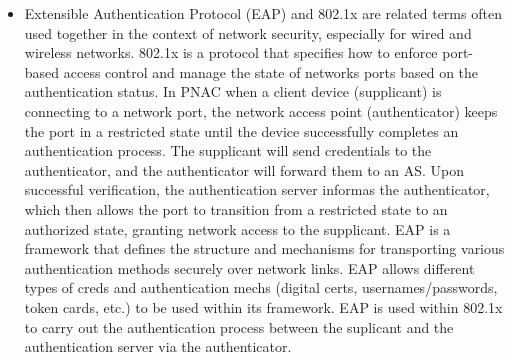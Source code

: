 \documentclass{article}
\begin{document}
\begin{itemize}
	\item[] Extensible Authentication Protocol (EAP) and 802.1x are related terms often used together in the context of network security, especially for wired and wireless networks. 802.1x is a protocol that specifies how to enforce port-based access control and manage the state of networks ports based on the authentication status. In PNAC when a client device (supplicant) is connecting to a network port, the network access point (authenticator) keeps the port in a restricted state until the device successfully completes an authentication process. The supplicant will send credentials to the authenticator, and the authenticator will forward them to an AS. Upon successful verification, the authentication server informas the authenticator, which then allows the port to transition from a restricted state to an authorized state, granting network access to the supplicant. EAP is a framework that defines the structure and mechanisms for transporting various authentication methods securely over network links. EAP allows different types of creds and authentication mechs (digital certs, usernames/passwords, token cards, etc.) to be used within its framework. EAP is used within 802.1x to carry out the authentication process between the suplicant and the authentication server via the authenticator.
	

\end{itemize}
\end{document}
